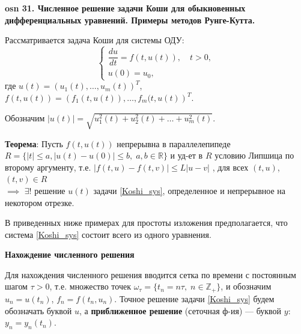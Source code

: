 \textbf{\LARGE osn 31. Численное решение задачи Коши для обыкновенных дифференциальных уравнений. Примеры методов Рунге-Кутта.}


Рассматривается задача Коши для системы ОДУ:
\begin{equation}
%
    \label{Koshi_sys}
    \begin{cases}
        \dfrac{du}{dt} = f(t, u(t)), \quad t > 0, \\
        u(0) = u_0,
    \end{cases}
\end{equation}
%
где
$u(t)=\left(u_1(t), \dots, u_m(t)\right)^T$, $f(t, u(t)) = \left(f_1(t, u(t)), \dots, f_m(t,u(t)\right)^T$.

Обозначим $ | u(t) | = \sqrt{u_1^2(t) + u_2^2(t) + \ldots + u_m^2(t)}$.

\textbf{Теорема}: Пусть $f(t, u(t))$ непрерывна в параллелепипеде 
$ R = \{|t| \leqslant a, | u(t)-u(0)| \leqslant b,\; a, b\in\mathbb{R}\} $ 
и уд-ет в $R$ условию Липшица по второму аргументу, т.е. 
$|f(t, u) - f(t, v)| \leqslant L|u - v|$
, для всех $(t, u)$, $(t, v) \in R$\\ 
$\implies $
$\exists!$ решение $u(t)$ задачи \eqref{Koshi_sys}, определенное и непрерывное на некотором отрезке.



В приведенных ниже примерах для простоты изложения предполагается, что
система \eqref{Koshi_sys} состоит всего из одного уравнения.

\centerline{\textbf{Нахождение численного решения}}


Для нахождения численного решения вводится сетка по времени с постоянным шагом $\tau>0$, т.е. множество точек
$\omega_\tau = \{t_n = n\tau,\;n \in \mathbb{Z}_+\}$, и обозначим
$u_n = u(t_n)$, $f_n = f(t_n, u_n)$.
Точное решение задачи \eqref{Koshi_sys} будем обозначать буквой $u$,
а \textbf{приближенное решение} (сеточная ф-ия) --- буквой $y$: $y_n = y_n(t_n)$.


